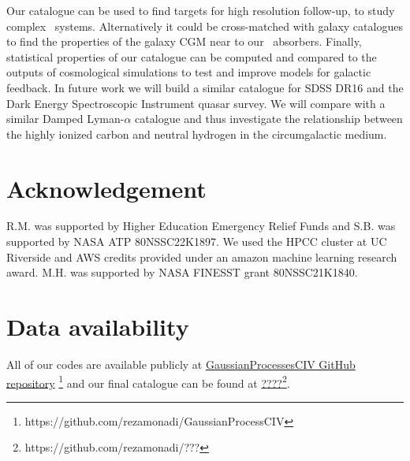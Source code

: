\documentclass[fleqn,usenatbib]{mnras}
\newcommand{\civ}{\ion{C}{IV}}
\newcommand{\nciv}{N_{\civ}} %
\newcommand{\zciv}{z_{\civ}}
\newcommand{\sciv}{\sigma_{\civ}}
\begin{document}
Our catalogue can be used to find targets for high resolution follow-up, to study complex \civ~systems. Alternatively it could be cross-matched with galaxy catalogues to find the properties of the galaxy CGM near to our \civ\ absorbers. Finally, statistical properties of our catalogue can be computed and compared to the outputs of cosmological simulations to test and improve models for galactic feedback.
In future work we will build a similar catalogue for SDSS DR16 and the Dark Energy Spectroscopic Instrument quasar survey. We will compare with a similar Damped Lyman-$\alpha$ catalogue and thus investigate the relationship between the highly ionized carbon and neutral hydrogen in the circumgalactic medium.

\section*{Acknowledgement}

R.M. was supported by Higher Education Emergency Relief Funds and S.B. was supported by NASA ATP 80NSSC22K1897.
We used the HPCC cluster at UC Riverside and AWS credits provided under an amazon machine learning research award. M.H. was supported by NASA FINESST grant 80NSSC21K1840.

\section*{Data availability}

All of our codes are available
publicly at  \href{https://github.com/rezamonadi/GaussianProcessCIV}
{GaussianProcessesCIV GitHub repository}
\footnote{https://github.com/rezamonadi/GaussianProcessCIV} and our final catalogue
can be found at \href{????}{????}\footnote{https://github.com/rezamonadi/???}.


\end{document}

